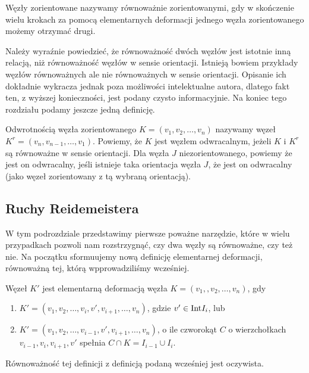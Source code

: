 \begin{definicja}
 Węzły zorientowane nazywamy równoważnie zorientowanymi, gdy w skończenie wielu krokach za pomocą elementarnych deformacji jednego węzła zorientowanego
 możemy otrzymać drugi.
\end{definicja}
Należy wyraźnie powiedzieć, że równoważność dwóch węzłów jest istotnie inną relacją, niż równoważność węzłów w sensie orientacji. Istnieją bowiem przykłady węzłów równoważnych
ale nie równoważnych w sensie orientacji. Opisanie ich dokładnie wykracza jednak poza możliwości intelektualne autora, dlatego fakt ten, z wyższej konieczności, jest podany
czysto informacyjnie. 
Na koniec tego rozdziału podamy jeszcze jedną definicję.
\begin{definicja}
 Odwrotnością węzła zorientowanego $K = (v_1, v_2, \ldots, v_n)$ nazywamy węzeł $K^r = (v_n, v_{n-1}, \ldots, v_1)$. Powiemy, że $K$ jest węzłem odwracalnym, jeżeli $K$ i $K^r$ są
 równoważne w sensie orientacji. Dla węzła $J$ niezorientowanego, powiemy że jest on odwracalny, jeśli istnieje taka orientacja węzła $J$, że jest on odwracalny (jako węzeł
 zorientowany z tą wybraną orientacją).
\end{definicja}


\subsection{Ruchy Reidemeistera}
W tym podrozdziale przedstawimy pierwsze poważne narzędzie, które w wielu przypadkach pozwoli nam rozstrzygnąć, czy dwa węzły są równoważne, czy też nie. 
Na początku sformuujemy nową definicję elementarnej deformacji, równoważną tej, którą wpprowadziliśmy wcześniej.

\begin{definicja}
\label{wygoda}
 Węzeł $K'$ jest elementarną deformacją węzła $K = (v_1,, v_2, \ldots, v_n)$, gdy
 \begin{enumerate}
  \item $K'=(v_1, v_2, \ldots, v_i, v', v_{i+1}, \ldots, v_n)$, gdzie $v'\in \hbox{Int}I_i$, lub
  \item $K' = (v_1, v_2, \ldots, v_{i-1}, v', v_{i+1}, \ldots, v_n)$, o ile czworokąt $C$ o wierzchołkach $v_{i-1}, v_i, v_{i+1}, v'$ spełnia $C\cap K = I_{i-1}\cup I_i$.
 \end{enumerate}
 Równoważność tej definicji z definicją podaną wcześniej jest oczywista.
\end{definicja}

